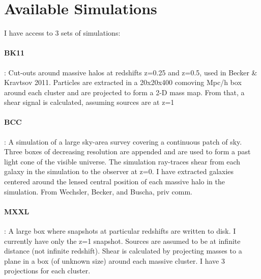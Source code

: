\documentclass[11pt]{article}
\begin{document}
\section{Available Simulations}

I have access to 3 sets of simulations:

\paragraph{BK11} : Cut-outs around massive halos at redshifts z=0.25 and z=0.5, used in Becker \& Kravtsov 2011. Particles are extracted in a 20x20x400 comoving Mpc/h box around each cluster and are projected to form a 2-D mass map. From that, a shear signal is calculated, assuming sources are at z=1

\paragraph{BCC} : A simulation of a large sky-area survey covering a continuous patch of sky. Three boxes of decreasing resolution are appended and are used to form a past light cone of the visible universe. The simulation ray-traces shear from each galaxy in the simulation to the observer at z=0. I have extracted galaxies centered around the lensed central position of each massive halo in the simulation. From Wechsler, Becker, and Buscha, priv comm.

\paragraph{MXXL}: A large box where snapshots at particular redshifts are written to disk. I currently have only the z=1 snapshot. Sources are assumed to be at infinite distance (not infinite redshift). Shear is calculated by projecting masses to a plane in a box (of unknown size) around each massive cluster. I have 3 projections for each cluster.


\clearpage \newpage
\end{document}
